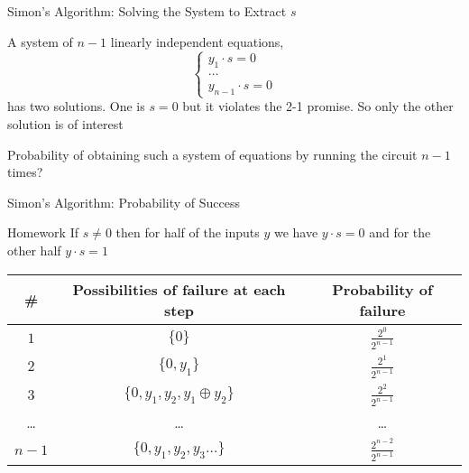 \documentclass{beamer}
\begin{document}
\begin{frame}{Simon's Algorithm: Solving the System to Extract $s$}

        A system of $n-1$ \alert{linearly independent} equations,
        \[
                \begin{cases}
                        y_1 \cdot s = 0 \\
                        \dots \\
                        y_{n-1} \cdot s = 0
                \end{cases}
        \]
        has two solutions.  One is $s = 0$ but it violates the 2-1
        promise. So only the other solution is of interest

        \pause
        Probability of obtaining such a system of equations
        by running the circuit $n-1$ times?
\end{frame}

\begin{frame}{Simon's Algorithm: Probability of Success}

        \begin{block}{Homework}
                If $s \not = 0$ then for half of the inputs $y$ we
                have $y \cdot s = 0$ and for the other half $y \cdot s = 1$ 
        \end{block}

        \vfill
        \begin{tabular}{|c | c | c| }
                \hline 
                \# & Possibilities of failure at each step &  Probability of failure 
                \\
                \hline
                $1$ & $\{0\}$ & $\frac{2^0}{2^{n-1}}$ \\
                \hline 
                $2$ & $\{0,y_1\}$ & $\frac{2^1}{2^{n-1}}$ \\
                \hline 
                $3$ & $\{0,y_1,y_2,y_1 \oplus y_2\}$ & $\frac{2^2}{2^{n-1}}$  \\
                \hline
                \dots & \dots & \dots \\
                \hline
                $n-1$ &  $\{0,y_1,y_2, y_3 \dots \}$ &  $\frac{2^{n-2}}{2^{n-1}}$ \\
                \hline
        \end{tabular}
\end{frame}
\end{document}
